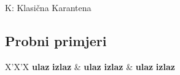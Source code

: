 \begin{statement}[
  timelimit=1 s,
  memorylimit=512 MiB,
]{K: Klasična Karantena}
\subsection*{Probni primjeri}
\begin{tabularx}{\textwidth}{X'X'X}
  \textbf{ulaz}
  \linespread{1}{}
  \textbf{izlaz}
  \linespread{1}{} &
  \textbf{ulaz}
  \linespread{1}{}
  \textbf{izlaz}
  \linespread{1}{} &
  \textbf{ulaz}
  \linespread{1}{}
  \textbf{izlaz}
  \linespread{1}{}
\end{tabularx}

\end{statement}

